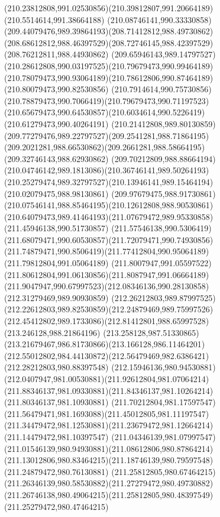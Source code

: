 {{		\curveto(210.23812808,991.02530856)(210.39812807,991.20664189)(210.5514614,991.38664188)
		\curveto(210.08746141,990.33330858)(209.44079476,989.39864193)(208.71412812,988.49730862)
		\curveto(208.68612812,988.46397529)(208.72746145,988.42397529)(208.76212811,988.44930862)
		\curveto(209.65946143,989.14797527)(210.28612808,990.03197525)(210.79679473,990.99464189)
		\curveto(210.78079473,990.93064189)(210.78612806,990.87464189)(210.80079473,990.82530856)
		\curveto(210.7914614,990.75730856)(210.78879473,990.7066419)(210.79679473,990.71197523)
		\curveto(210.65679473,990.64530857)(210.6034614,990.5226419)(210.61279473,990.40264191)
		\curveto(210.21412808,989.80130859)(209.77279476,989.22797527)(209.2541281,988.71864195)
		\curveto(209.2021281,988.66530862)(209.2661281,988.58664195)(209.32746143,988.62930862)
		\curveto(209.70212809,988.88664194)(210.04746142,989.1813086)(210.36746141,989.50264193)
		\curveto(210.25279474,989.32797527)(210.13946141,989.15464194)(210.02079475,988.98130861)
		\curveto(209.97679475,988.91730861)(210.07546141,988.85464195)(210.12612808,988.90530861)
		\curveto(210.64079473,989.41464193)(211.07679472,989.95330858)(211.45946138,990.51730857)
		\curveto(211.57546138,990.5306419)(211.68079471,990.60530857)(211.72079471,990.74930856)
		\curveto(211.74879471,990.8506419)(211.77412804,990.95064189)(211.79812804,991.05064189)
		\curveto(211.8007947,991.05597522)(211.80612804,991.06130856)(211.8087947,991.06664189)
		\curveto(211.9047947,990.67997523)(212.08346136,990.28130858)(212.31279469,989.90930859)
		\curveto(212.26212803,989.87997525)(212.22612803,989.82530859)(212.24879469,989.75997526)
		\curveto(212.45412802,989.1733086)(212.81412801,988.65997528)(213.246128,988.21864196)
		\curveto(213.258128,987.51330865)(213.21679467,986.81730866)(213.166128,986.11464201)
		\curveto(212.55012802,984.44130872)(212.56479469,982.6386421)(212.28212803,980.88397548)
		\curveto(212.15946136,980.94530881)(212.0407947,981.00530881)(211.92612804,981.07064214)
		\curveto(211.88346137,981.09330881)(211.84346137,981.10264214)(211.80346137,981.10930881)
		\curveto(211.70212804,981.17597547)(211.56479471,981.1693088)(211.45012805,981.11197547)
		\curveto(211.34479472,981.12530881)(211.23679472,981.12664214)(211.14479472,981.10397547)
		\curveto(211.04346139,981.07997547)(211.01546139,980.94930881)(211.08612806,980.87864214)
		\curveto(211.13012806,980.83464215)(211.18746139,980.79597548)(211.24879472,980.76130881)
		\curveto(211.25812805,980.67464215)(211.26346139,980.58530882)(211.27279472,980.49730882)
		\curveto(211.26746138,980.49064215)(211.25812805,980.48397549)(211.25279472,980.47464215)
}}
